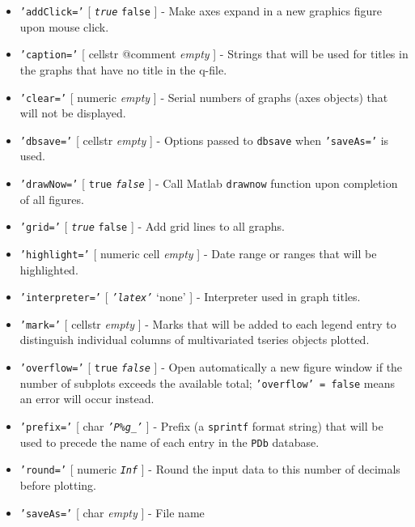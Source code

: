  \begin{itemize}
 \item
   \texttt{'addClick='} {[} \emph{\texttt{true}} \textbar{}
   \texttt{false} {]} - Make axes expand in a new graphics figure upon
   mouse click.
 \item
   \texttt{'caption='} {[} cellstr \textbar{} @comment \textbar{}
   \emph{empty} {]} - Strings that will be used for titles in the graphs
   that have no title in the q-file.
 \item
   \texttt{'clear='} {[} numeric \textbar{} \emph{empty} {]} - Serial
   numbers of graphs (axes objects) that will not be displayed.
 \item
   \texttt{'dbsave='} {[} cellstr \textbar{} \emph{empty} {]} - Options
   passed to \texttt{dbsave} when \texttt{'saveAs='} is used.
 \item
   \texttt{'drawNow='} {[} \texttt{true} \textbar{} \emph{\texttt{false}}
   {]} - Call Matlab \texttt{drawnow} function upon completion of all
   figures.
 \item
   \texttt{'grid='} {[} \emph{\texttt{true}} \textbar{} \texttt{false}
   {]} - Add grid lines to all graphs.
 \item
   \texttt{'highlight='} {[} numeric \textbar{} cell \textbar{}
   \emph{empty} {]} - Date range or ranges that will be highlighted.
 \item
   \texttt{'interpreter='} {[} \emph{\texttt{'latex'}} \textbar{} `none'
   {]} - Interpreter used in graph titles.
 \item
   \texttt{'mark='} {[} cellstr \textbar{} \emph{empty} {]} - Marks that
   will be added to each legend entry to distinguish individual columns
   of multivariated tseries objects plotted.
 \item
   \texttt{'overflow='} {[} \texttt{true} \textbar{}
   \emph{\texttt{false}} {]} - Open automatically a new figure window if
   the number of subplots exceeds the available total;
   \texttt{'overflow' = false} means an error will occur instead.
 \item
   \texttt{'prefix='} {[} char \textbar{} \emph{\texttt{'P\%g\_'}} {]} -
   Prefix (a \texttt{sprintf} format string) that will be used to precede
   the name of each entry in the \texttt{PDb} database.
 \item
   \texttt{'round='} {[} numeric \textbar{} \emph{\texttt{Inf}} {]} -
   Round the input data to this number of decimals before plotting.
 \item
   \texttt{'saveAs='} {[} char \textbar{} \emph{empty} {]} - File name

\end{itemize}
